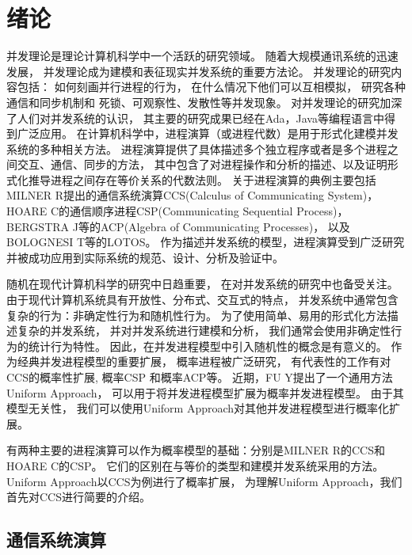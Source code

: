 
\chapter{绪论}\label{ch:intro}

并发理论是理论计算机科学中一个活跃的研究领域。
  随着大规模通讯系统的迅速发展，
  并发理论成为建模和表征现实并发系统的重要方法论。
  并发理论的研究内容包括：
  如何刻画并行进程的行为，
  在什么情况下他们可以互相模拟，
  研究各种通信和同步机制和
  死锁、可观察性、发散性等并发现象。
  对并发理论的研究加深了人们对并发系统的认识，
  其主要的研究成果已经在Ada，Java等编程语言中得到广泛应用\cite{计算机科学技术百科全书}。
  在计算机科学中，进程演算（或进程代数）是用于形式化建模并发系统的多种相关方法。
  进程演算提供了具体描述多个独立程序或者是多个进程之间交互、通信、同步的方法，
  其中包含了对进程操作和分析的描述、以及证明形式化推导进程之间存在等价关系的代数法则\cite{History}。
  关于进程演算的典例主要包括
  MILNER R提出的通信系统演算CCS(Calculus of Communicating System)\cite{Milner_CCS}，
   HOARE C的通信顺序进程CSP(Communicating Sequential Process)\cite{Hoare_CSP}，
   BERGSTRA J等的ACP(Algebra of Communicating Processes)\cite{BERGSTRA_ACP}，
   以及BOLOGNESI T等的LOTOS\cite{LOTOS}。%
   作为描述并发系统的模型，进程演算受到广泛研究并被成功应用到实际系统的规范、设计、分析及验证中。

随机在现代计算机科学的研究中日趋重要，
在对并发系统的研究中也备受关注。
由于现代计算机系统具有开放性、分布式、交互式的特点，
并发系统中通常包含复杂的行为：非确定性行为和随机性行为。
为了使用简单、易用的形式化方法描述复杂的并发系统，
并对并发系统进行建模和分析，
我们通常会使用非确定性行为的统计行为特性。
因此，在并发进程模型中引入随机性的概念是有意义的。
作为经典并发进程模型的重要扩展，
概率进程被广泛研究，
有代表性的工作有对CCS的概率性扩展\cite{CCS_Prob_1,CCS_Prob_2},
概率CSP\cite{CSP_Prob} 和概率ACP\cite{ACP_Prob}等。
近期，FU Y提出了一个通用方法Uniform Approach\cite{Fu_UniformApproach}，
可以用于将并发进程模型扩展为概率并发进程模型。
由于其模型无关性，
我们可以使用Uniform Approach对其他并发进程模型进行概率化扩展。

有两种主要的进程演算可以作为概率模型的基础：分别是MILNER R的CCS\cite{Milner_CCS}和HOARE C的CSP\cite{Hoare_CSP}。
它们的区别在与等价的类型和建模并发系统采用的方法\cite{DIFF_CCS_CSP}。
Uniform Approach以CCS为例进行了概率扩展，
为理解Uniform Approach，我们首先对CCS进行简要的介绍。

\section{通信系统演算}


